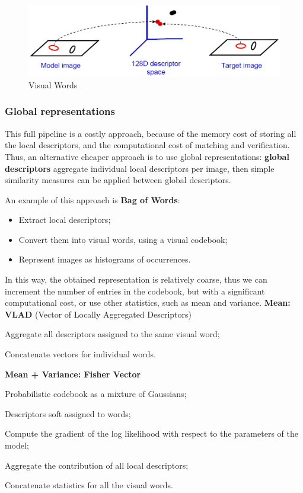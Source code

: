 \begin{figure}[h!]
    \centering
    \includegraphics[width=0.7\linewidth]{images/visual-words}
    \caption[Visual Words]{Visual Words}
    \label{fig:visual-words}
\end{figure}


\subsubsection{Global representations}\label{sec:vs-global}

This full pipeline is a costly approach, because of the memory cost of storing all the local descriptors, and the computational cost of matching and verification. Thus, an alternative cheaper approach is to use global representations: \textbf{global descriptors} aggregate individual local descriptors per image, then simple similarity measures can be applied between global descriptors.

An example of this approach is \textbf{Bag of Words}:
\begin{itemize}
    \item Extract local descriptors;
    \item Convert them into visual words, using a visual codebook;
    \item Represent images as histograms of occurrences.
\end{itemize}

In this way, the obtained representation is relatively coarse, thus we can increment the number of entries in the codebook, but with a significant computational cost, or use other statistics, such as mean and variance.
\textbf{Mean: VLAD} (Vector of Locally Aggregated Descriptors)
\begin{myitem}
    \item Aggregate all descriptors assigned to the same visual word;
    \item Concatenate vectors for individual words.
\end{myitem}
\textbf{Mean + Variance: Fisher Vector}
\begin{myitem}
    \item Probabilistic codebook as a mixture of Gaussians;
    \item Descriptors soft assigned to words;
    \item Compute the gradient of the log likelihood with respect to the parameters of the model;
    \item Aggregate the contribution of all local descriptors;
    \item Concatenate statistics for all the visual words.
\end{myitem}

